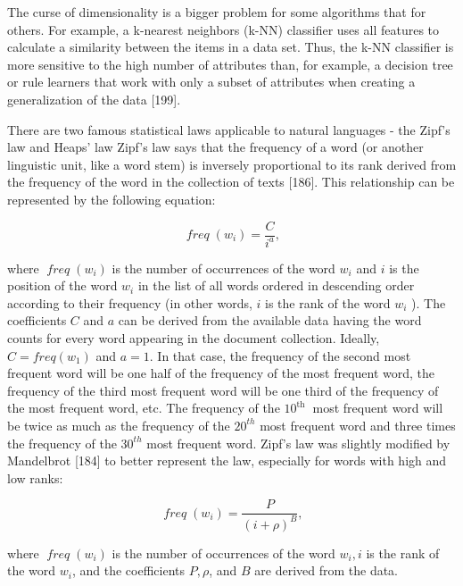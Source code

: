 \documentclass[11pt,openany,executivepaper]{book}
\begin{document}
The curse of dimensionality is a bigger problem for some algorithms that for others. For example, a k-nearest neighbors (k-NN) classifier uses all features to calculate a similarity between the items in a data set. Thus, the k-NN classifier is more sensitive to the high number of attributes than, for example, a decision tree or rule learners that work with only a subset of attributes when creating a generalization of the data [199].

There are two famous statistical laws applicable to natural languages - the Zipf's law and Heaps' law Zipf's law says that the frequency of a word (or another linguistic unit, like a word stem) is inversely proportional to its rank derived from the frequency of the word in the collection of texts [186]. This relationship can be represented by the following equation:


\begin{equation*}
\operatorname{\textit{freq}}\left(w_{i}\right)=\frac{C}{i^{a}}, \tag{3.1}
\end{equation*}


where $\operatorname{\textit{freq}}\left(w_{i}\right)$ is the number of occurrences of the word $w_{i}$ and $i$ is the position of the word $w_{i}$ in the list of all words ordered in descending order according to their frequency (in other words, $i$ is the rank of the word $w_{i}$ ). The coefficients $C$ and $a$ can be derived from the available data having the word counts for every word appearing in the document collection. Ideally, $C=f r e q\left(w_{1}\right)$ and $a=1$. In that case, the frequency of the second most frequent word will be one half of the frequency of the most frequent word, the frequency of the third most frequent word will be one third of the frequency of the most frequent word, etc. The frequency of the $10^{\text {th }}$ most frequent word will be twice as much as the frequency of the $20^{t h}$ most frequent word and three times the frequency of the $30^{t h}$ most frequent word. Zipf's law was slightly modified by Mandelbrot [184] to better represent the law, especially for words with high and low ranks:


\begin{equation*}
\operatorname{\textit{freq}}\left(w_{i}\right)=\frac{P}{(i+\rho)^{B}}, \tag{3.2}
\end{equation*}


where $\operatorname{\textit{freq}}\left(w_{i}\right)$ is the number of occurrences of the word $w_{i}, i$ is the rank of the word $w_{i}$, and the coefficients $P, \rho$, and $B$ are derived from the data.
\end{document}
